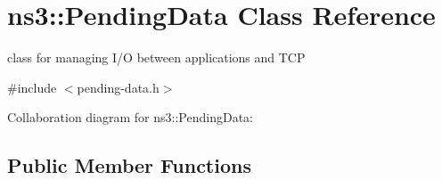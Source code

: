 \hypertarget{classns3_1_1PendingData}{}\section{ns3\+:\+:Pending\+Data Class Reference}
\label{classns3_1_1PendingData}


class for managing I/O between applications and T\+CP  




{\ttfamily \#include $<$pending-\/data.\+h$>$}



Collaboration diagram for ns3\+:\+:Pending\+Data\+:
\subsection*{Public Member Functions}
